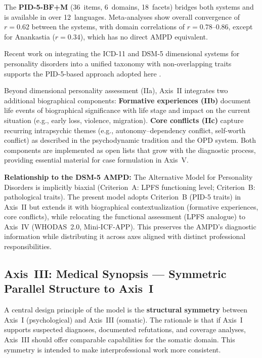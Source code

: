 \documentclass[11pt,a4paper]{article}
\begin{document}
The \textbf{PID-5-BF+M} (36~items, 6~domains, 18~facets) bridges both systems and is available in over 12~languages. Meta-analyses show overall convergence of $r = 0.62$ between the systems, with domain correlations of $r = 0.78$--$0.86$, except for Anankastia ($r = 0.34$), which has no direct AMPD equivalent.

Recent work on integrating the ICD-11 and DSM-5 dimensional systems for personality disorders into a unified taxonomy with non-overlapping traits supports the PID-5-based approach adopted here \citep{Bach2022}.

Beyond dimensional personality assessment (IIa), Axis~II integrates two additional biographical components: \textbf{Formative experiences (IIb)} document life events of biographical significance with life stage and impact on the current situation (e.g., early loss, violence, migration). \textbf{Core conflicts (IIc)} capture recurring intrapsychic themes (e.g., autonomy--dependency conflict, self-worth conflict) as described in the psychodynamic tradition and the OPD system. Both components are implemented as open lists that grow with the diagnostic process, providing essential material for case formulation in Axis~V.

\textbf{Relationship to the DSM-5 AMPD:} The Alternative Model for Personality Disorders is implicitly biaxial (Criterion~A: LPFS functioning level; Criterion~B: pathological traits). The present model adopts Criterion~B (PID-5 traits) in Axis~II but extends it with biographical contextualization (formative experiences, core conflicts), while relocating the functional assessment (LPFS analogue) to Axis~IV (WHODAS~2.0, Mini-ICF-APP). This preserves the AMPD's diagnostic information while distributing it across axes aligned with distinct professional responsibilities.

\subsection{Axis~III: Medical Synopsis --- Symmetric Parallel Structure to Axis~I}
\label{sec:axis3}

A central design principle of the model is the \textbf{structural symmetry} between Axis~I (psychological) and Axis~III (somatic). The rationale is that if Axis~I supports suspected diagnoses, documented refutations, and coverage analyses, Axis~III should offer comparable capabilities for the somatic domain. This symmetry is intended to make interprofessional work more consistent.
\end{document}
